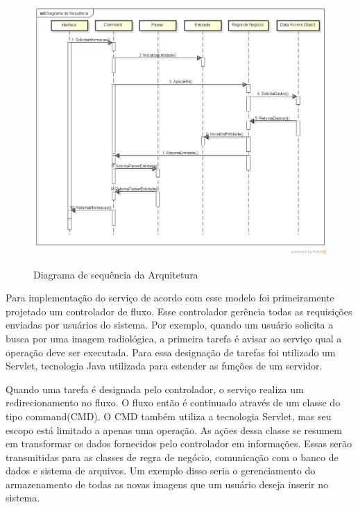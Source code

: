 \begin{figure}[ht]
	\centering	
	\caption[\hspace{0.1cm}Diagrama de Sequência.]{Diagrama de sequência da Arquitetura}
	\vspace{-0.4cm}
	\includegraphics[width=1.0\textwidth]{figuras/diagramas/sequencia.png}
	\vspace{-0.2cm}
	\label{fig:figura2}
\end{figure}

Para implementação do serviço de acordo com esse modelo foi primeiramente projetado um controlador de fluxo.
Esse controlador gerência todas as requisições enviadas por usuários do sistema.
Por exemplo, quando um usuário solicita a busca por uma imagem radiológica, a primeira tarefa é avisar ao serviço qual a operação deve ser executada.
Para essa designação de tarefas foi utilizado um Servlet, tecnologia Java utilizada para estender as funções de um servidor.

Quando uma tarefa é designada pelo controlador, o serviço realiza um redirecionamento no fluxo.
O fluxo então é continuado através de um classe do tipo command(CMD).
O CMD também utiliza a tecnologia Servlet, mas seu escopo está limitado a apenas uma operação.
As ações dessa classe se resumem em transformar os dados fornecidos pelo controlador em informações.
Essas serão transmitidas para as classes de regra de negócio, comunicação com o banco de dados e sistema de arquivos.
Um exemplo disso seria o gerenciamento do armazenamento de todas as novas imagens que um usuário deseja inserir no sistema.

